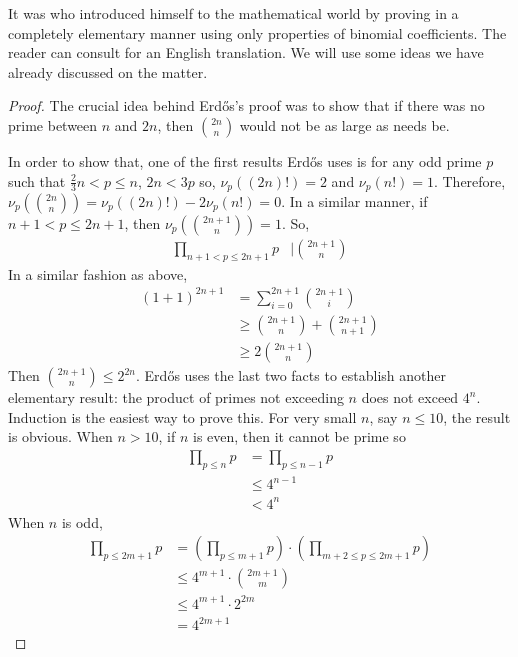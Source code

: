 \documentclass[elemannt.tex]{subfile}
\begin{document}
	It was \textcite{erdos_1932} who introduced himself to the mathematical world by proving  in a completely elementary manner using only properties of binomial coefficients. The reader can consult \textcite[$\S2$]{aigner_ziegler_guunter_m_1999} for an English translation. We will use some ideas we have already discussed on the matter.
		\begin{proof}
			The crucial idea behind Erd\H{o}s's proof was to show that if there was no prime between $n$ and $2n$, then $\binom{2n}{n}$ would not be as large as needs be.

			In order to show that, one of the first results Erd\H{o}s uses is for any odd prime $p$ such that $\frac{2}{3}n<p\leq n$, $2n<3p$ so, $\nu_{p}((2n)!)=2$ and $\nu_{p}(n!)=1$. Therefore, $\nu_{p}\left(\binom{2n}{n}\right)=\nu_{p}((2n)!)-2\nu_{p}(n!)=0$. In a similar manner, if $n+1<p\leq 2n+1$, then $\nu_{p}\left(\binom{2n+1}{n}\right)=1$. So,
				\begin{align*}
					\prod_{n+1<p\leq 2n+1}p
						& \mid \binom{2n+1}{n}
				\end{align*}
			In a similar fashion as above,
				\begin{align*}
					(1+1)^{2n+1}
						& = \sum_{i=0}^{2n+1}\binom{2n+1}{i}\\
						& \geq\binom{2n+1}{n}+\binom{2n+1}{n+1}\\
						& \geq 2\binom{2n+1}{n}
				\end{align*}
			Then $\binom{2n+1}{n}\leq 2^{2n}$. Erd\H{o}s uses the last two facts to establish another elementary result: the product of primes not exceeding $n$ does not exceed $4^{n}$. Induction is the easiest way to prove this. For very small $n$, say $n\leq 10$, the result is obvious. When $n>10$, if $n$ is even, then it cannot be prime so
				\begin{align*}
					\prod_{p\leq n}p
						& = \prod_{p\leq n-1}p\\
						& \leq 4^{n-1}\\
						& < 4^{n}
				\end{align*}
			When $n$ is odd,
				\begin{align*}
					\prod_{p\leq 2m+1}p
						& = \left(\prod_{p\leq m+1}p\right)\cdot\left(\prod_{m+2\leq p\leq 2m+1}p\right)\\
						& \leq 4^{m+1}\cdot\binom{2m+1}{m}\\
						& \leq 4^{m+1}\cdot 2^{2m}\\
						& = 4^{2m+1}
				\end{align*}

\end{proof}
\end{document}

